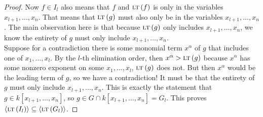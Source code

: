 \documentclass{homework}
\newcommand{\LTg}[1]{\langle\LT{#1}\rangle}
\newcommand{\LT}[1]{\textsc{lt}\left(#1\right)}
\begin{document}
\begin{enumerate}[(a)]
\begin{proof}
            Now $f \in I_l$ also means that $f$ and $\LT f$ is only in the variables $x_{l+1}, \dots, x_n$. That means that $\LT g$ must also only be in the variables $x_{l+1}, \dots, x_n$. The main observation here is that because $\LT g$ only includes $x_{l+1}, \dots, x_n$, we know the entirety of $g$ must only include $x_{l+1}, \dots, x_n$. \\
            
            Suppose for a contradiction there is some monomial term $x^\alpha$ of $g$ that includes one of $x_1, \dots, x_l$. By the $l$-th elimination order, then $x^\alpha > \LT{g}$ because $x^\alpha$ has some nonzero exponent on some $x_1, \dots, x_l$, $\LT{g}$ does not. But then $x^\alpha$ would be the leading term of $g$, so we have a contradiction! It must be that the entirety of $g$ must only include $x_{l+1}, \dots, x_n$. This is exactly the statement that $g \in k[x_{l+1}, \dots, x_n]$, so $g \in G \cap k[x_{l+1}, \dots, x_n] = G_l$. This proves $\LTg{I_l} \subseteq \LTg{G_l}$. 
        \end{proof}
    \end{enumerate}
\end{document}
